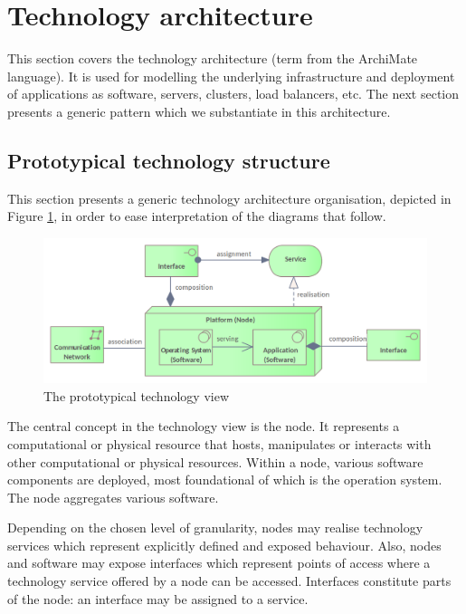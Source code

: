 \section{Technology architecture}
\label{sec:technology-architecture}

    This section covers the technology architecture (term from the ArchiMate language). It is used for modelling the underlying infrastructure and deployment of applications as software, servers, clusters, load balancers, etc. The next section presents a generic pattern which we substantiate in this architecture. 
    
	\subsection{Prototypical technology structure}
	
	This section presents a generic technology architecture organisation, depicted in Figure \ref{fig:technology-view}, in order to ease interpretation of the diagrams that follow.
	
	\begin{figure}[!h]
		\centering
		\includegraphics[width=.75\textwidth]{images/views/Technology View.png}
		\caption{The prototypical technology view}
		\label{fig:technology-view}
	\end{figure}

	The central concept in the technology view is the node. It represents a computational or physical resource that hosts, manipulates or interacts with other computational or physical resources. Within a node, various software components are deployed, most foundational of which is the operation system. The node aggregates various software. 
	
	Depending on the chosen level of granularity, nodes may realise technology services which represent explicitly defined and exposed behaviour. Also, nodes and software may expose interfaces which represent points of access where a technology service offered by a node can be accessed. Interfaces constitute parts of the node: an interface may be assigned to a service.
	
